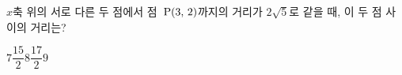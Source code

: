 $x$축 위의 서로 다른 두 점에서 점~$\mathrm{P}(3,\,2)$까지의 거리가 $2\sqrt{5}$로 같을 때, 이 두 점 사이의 거리는?
\begin{choices32}{$7$}{$\dfrac{15}{2}$}{$8$}{$\dfrac{17}{2}$}{$9$}\end{choices32}
